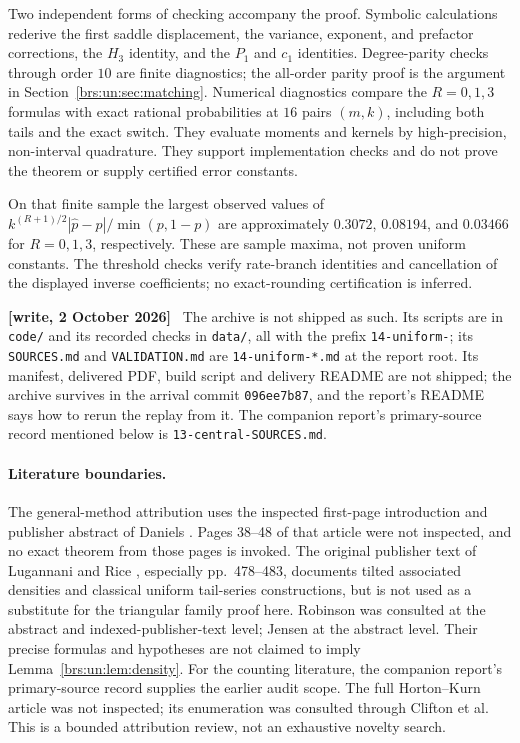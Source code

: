\documentclass[11pt]{article}
\numberwithin{equation}{section}
\theoremstyle{remark}\newtheorem{remark}[theorem]{Remark}
\newcommand{\file}[1]{\nolinkurl{#1}}
\newenvironment{writenote}{\par\smallskip\begingroup\small\noindent\textbf{[write, 2 October 2026]}\ }{\par\endgroup\smallskip}
\begin{document}
Two independent forms of checking accompany the proof.  Symbolic
calculations rederive the first saddle displacement, the variance,
exponent, and prefactor corrections, the $H_3$ identity, and the
$P_1$ and $c_1$ identities.  Degree-parity checks through order $10$
are finite diagnostics; the all-order parity proof is the argument
in Section~\ref{brs:un:sec:matching}.  Numerical diagnostics compare the
$R=0,1,3$ formulas with exact rational probabilities at $16$ pairs
$(m,k)$, including both tails and the exact switch.  They evaluate
moments and kernels by high-precision, non-interval quadrature.
They support implementation checks and do not prove the theorem or
supply certified error constants.

On that finite sample the largest observed values of
$k^{(R+1)/2}|\widehat p-p|/\min(p,1-p)$ are approximately
$0.3072$, $0.08194$, and $0.03466$ for $R=0,1,3$, respectively.
These are sample maxima, not proven uniform constants.  The threshold
checks verify rate-branch identities and cancellation of the displayed
inverse coefficients; no exact-rounding certification is inferred.

\begin{writenote}
The archive is not shipped as such. Its scripts are in \file{code/} and its recorded checks in \file{data/}, all with the prefix \file{14-uniform-}; its \file{SOURCES.md} and \file{VALIDATION.md} are \file{14-uniform-*.md} at the report root. Its manifest, delivered PDF, build script and delivery README are not shipped; the archive survives in the arrival commit \texttt{096ee7b87}, and the report's README says how to rerun the replay from it. The companion report's primary-source record mentioned below is \file{13-central-SOURCES.md}.
\end{writenote}

\paragraph{Literature boundaries.}
The general-method attribution uses the inspected first-page
introduction and publisher abstract of Daniels \cite{daniels}.
Pages 38--48 of that article were not inspected, and no exact theorem
from those pages is invoked.  The original publisher text of
Lugannani and Rice \cite{lr}, especially pp.\ 478--483, documents
tilted associated densities and classical uniform tail-series
constructions, but is not used as a substitute for the triangular
family proof here.  Robinson \cite{robinson} was consulted at the
abstract and indexed-publisher-text level; Jensen \cite{jensen}
at the abstract level.  Their precise formulas and hypotheses are
not claimed to imply Lemma~\ref{brs:un:lem:density}.  For the counting
literature, the companion report's primary-source record supplies
the earlier audit scope.  The full Horton--Kurn article was not
inspected; its enumeration was consulted through Clifton et al.
This is a bounded attribution review, not an exhaustive novelty search.
\end{document}
